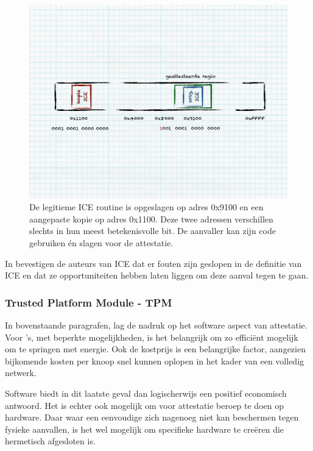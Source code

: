 \begin{figure}[ht]
  \centering
  \includegraphics[width=0.9\linewidth]{resources/attestation-ice-copy.pdf}

  \caption[Omzeilen van ICE-gebaseerde software-attestatie]{De legitieme ICE
  routine is opgeslagen op adres 0x9100 en een aangepaste kopie op adres
  0x1100. Deze twee adressen verschillen slechts in hun meest betekenisvolle
  bit. De aanvaller kan zijn code gebruiken \'en slagen voor de attestatie.}

  \label{fig:attestation-ice-copy}
\end{figure}

In \citep{perrig2010refutation} bevestigen de auteurs van ICE dat er fouten
zijn geslopen in de definitie van ICE en dat ze opportuniteiten hebben laten
liggen om deze aanval tegen te gaan.

\subsubsection*{Trusted Platform Module - TPM}

In bovenstaande paragrafen, lag de nadruk op het software aspect van
attestatie. Voor \mcu's, met beperkte mogelijkheden, is het belangrijk om zo
effici\"ent mogelijk om te springen met energie. Ook de kostprijs is een
belangrijke factor, aangezien bijkomende kosten per knoop snel kunnen oplopen
in het kader van een volledig netwerk.

Software biedt in dit laatste geval dan logischerwijs een positief economisch
antwoord. Het is echter ook mogelijk om voor attestatie beroep te doen op
hardware. Daar waar een eenvoudige \mcu zich nagenoeg niet kan beschermen tegen
fysieke aanvallen, is het wel mogelijk om specifieke hardware te cre\"eren die
hermetisch afgesloten is.

